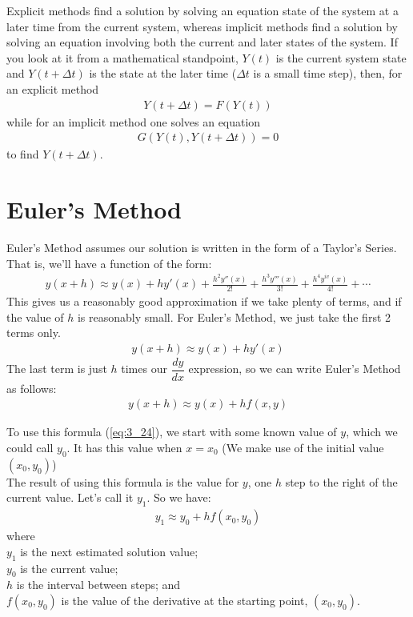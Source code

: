 \documentclass[11pt]{report}
\newcommand{\sps}{\\[0.2cm]}
\newcommand{\refn}[1]{(\ref{#1})}
\newcommand{\refx}[1]{\refn{eq:#1}}
\newcommand{\NI}{\noindent}
\begin{document}
	\NI Explicit methods find a solution by solving an equation state of the system at a later time from the current system, whereas implicit methods find a solution by solving an equation involving both the current and later states of the system. If you look at it from a mathematical standpoint, $Y(t)$  is the current system state and $Y(t+\Delta t)$ is the state at the later time ($\Delta t$ is a small time step), then, for an explicit method
	\begin{eqnarray}
		Y(t+\Delta t) =F(Y(t))
	\end{eqnarray}
	while for an implicit method one solves an equation
	\begin{eqnarray}
		G(Y(t),Y(t+ \Delta t) ) =0
	\end{eqnarray}
	to find $Y(t+ \Delta t)$.
	
	
	\section{Euler's Method}
	Euler's Method assumes our solution is written in the form of a Taylor's Series. That is, we'll have a function of the form:
	\begin{eqnarray}
		y(x+h) \approx y(x) + hy'(x) + \frac{h^2 y''(x)}{2!} + \frac{h^3 y'''(x)}{3!} + \frac{h^4 y^{iv}(x)}{4!} + \cdots
	\end{eqnarray}
	This gives us a reasonably good approximation if we take plenty of terms, and if the value of $h$ is reasonably small. For Euler's Method, we just take the first 2 terms only.
	\begin{eqnarray}
			y(x+h) \approx y(x) + hy'(x)
	\end{eqnarray}
	The last term is just $h$ times our $\dfrac{dy}{dx}$ expression, so we can write Euler's Method as follows:
	\begin{eqnarray}
		y(x+h) \approx y(x) + hf(x,y)\label{eq:3_24}
	\end{eqnarray}
	
	\NI To use this formula \refx{3_24}, we start with some known value of $y$, which we could call $y_0$. It has this value when $x=x_0$ (We make use of the initial value $(x_0,y_0)$)\sps
	The result of using this formula is the value for $y$, one $h$ step to the right of the current value. Let's call it $y_1$. So we have:
	\begin{eqnarray*}
		y_1 \approx y_0 + hf(x_0,y_0)
	\end{eqnarray*}
	where\\
	$y_1$ is the next estimated solution value;\\
	$y_0$ is the current value;\\
	$h$ is the interval between steps; and \\
	$f(x_0,y_0)$ is the value of the derivative at the starting point, $(x_0,y_0)$.
	
\end{document}
